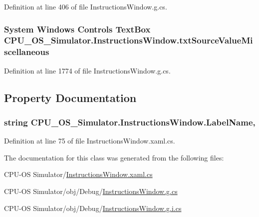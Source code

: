 Definition at line 406 of file Instructions\+Window.\+g.\+cs.

\hypertarget{class_c_p_u___o_s___simulator_1_1_instructions_window_a555d604d5869d89442a35900abc35914}{}
\subsubsection[{txt\+Source\+Value\+Miscellaneous}]{\setlength{\rightskip}{0pt plus 5cm}System Windows Controls Text\+Box C\+P\+U\+\_\+\+O\+S\+\_\+\+Simulator.\+Instructions\+Window.\+txt\+Source\+Value\+Miscellaneous\hspace{0.3cm}{\ttfamily [package]}}\label{class_c_p_u___o_s___simulator_1_1_instructions_window_a555d604d5869d89442a35900abc35914}


Definition at line 1774 of file Instructions\+Window.\+g.\+cs.



\subsection{Property Documentation}
\hypertarget{class_c_p_u___o_s___simulator_1_1_instructions_window_a46ace6a9298e94c75f204404a846801a}{}
\subsubsection[{Label\+Name}]{\setlength{\rightskip}{0pt plus 5cm}string C\+P\+U\+\_\+\+O\+S\+\_\+\+Simulator.\+Instructions\+Window.\+Label\+Name\hspace{0.3cm}{\ttfamily [get]}, {\ttfamily [set]}}\label{class_c_p_u___o_s___simulator_1_1_instructions_window_a46ace6a9298e94c75f204404a846801a}


Definition at line 75 of file Instructions\+Window.\+xaml.\+cs.



The documentation for this class was generated from the following files\+:\begin{DoxyCompactItemize}
\item 
C\+P\+U-\/\+O\+S Simulator/\hyperlink{_instructions_window_8xaml_8cs}{Instructions\+Window.\+xaml.\+cs}\item 
C\+P\+U-\/\+O\+S Simulator/obj/\+Debug/\hyperlink{_instructions_window_8g_8cs}{Instructions\+Window.\+g.\+cs}\item 
C\+P\+U-\/\+O\+S Simulator/obj/\+Debug/\hyperlink{_instructions_window_8g_8i_8cs}{Instructions\+Window.\+g.\+i.\+cs}\end{DoxyCompactItemize}

